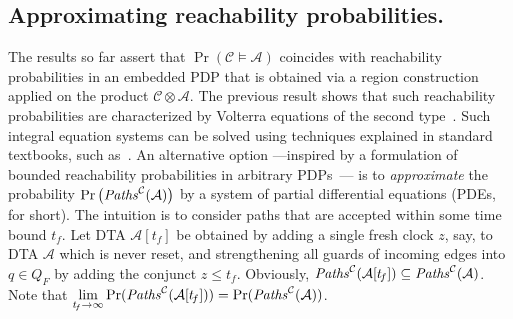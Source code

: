 \documentclass{LMCS}
\newcommand{\mc}[1]{\mathcal{#1}}
\newcommand{\<}{\langle}
\renewcommand{\>}{\rangle}
\newcommand{\PDE}{\textsc{PDE}}
\newcommand{\Paths}{{\it Paths}}
\begin{document}
\subsection*{Approximating reachability probabilities.}\label{sec:PDE}
The results so far assert that $\Pr(\mc{C} \models \mc{A})$ coincides with reachability
probabilities in an embedded PDP that is obtained via a region construction applied
on the product $\mc{C}\otimes \mc{A}$.
The previous result shows that such reachability probabilities are characterized by
Volterra equations of the second type~\cite{AWW95}.
Such integral equation systems can be solved using techniques explained in standard
textbooks, such as~\cite{Cord91}.
An alternative option ---inspired by a formulation of bounded reachability probabilities
in arbitrary PDPs~\cite{Dav93}--- is to \emph{approximate} the probability $\Pr \big(\Paths^{\mc{C}}(\mc{A})\big)$ by a system of partial differential equations (\PDE s,
for short).
The intuition is to consider paths that are accepted within some time bound $t_{\!f}$.
Let DTA $\mc{A}[t_{\!f}]$ be obtained by adding a single fresh clock $z$, say, to DTA
$\mc{A}$ which is never reset, and strengthening all guards of incoming edges into
$q \in Q_F$ by adding the conjunct $z \leqslant t_{\!f}$.
Obviously, $\Paths^{\mc{C}}(\mc{A}[t_{\!f}]) \subseteq \Paths^{\mc{C}}(\mc{A})$.
Note that $\displaystyle \lim_{t_{\!f}\to\infty}\Pr (\Paths^{\mc{C}}(\mc{A}[t_{\!f}])) =
\Pr (\Paths^{\mc{C}}(\mc{A}))$.
\end{document}
